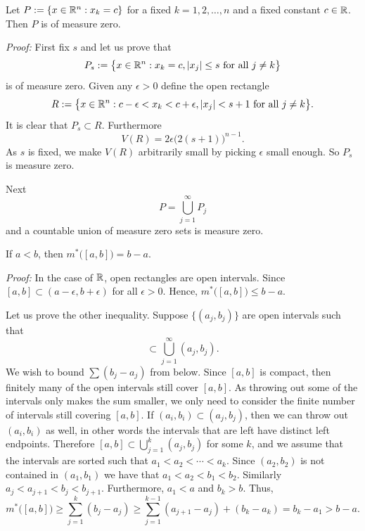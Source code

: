 \begin{example} \label{mv:example:planenull}
Let $P := \{ x \in {\mathbb{R}}^n : x_k = c \}$ for a fixed $k=1,2,\ldots,n$ and
a fixed constant $c \in {\mathbb{R}}$.  Then $P$ is of measure zero.

\emph{Proof:}
First fix $s$ and let us prove that
\begin{equation*}
P_s := \bigl\{ x \in {\mathbb{R}}^n : x_k = c, \lvert {x_j} \rvert \leq s \text{ for all
$j\not=k$} \bigr\}
\end{equation*}
is of measure zero.
Given any $\epsilon > 0$ define the open rectangle
\begin{equation*}
R := \bigl\{ x \in {\mathbb{R}}^n : c-\epsilon < x_k < c+\epsilon, \lvert {x_j} \rvert < s+1
\text{ for all $j\not=k$} \bigr\} .
\end{equation*}
It is clear that $P_s \subset R$.  Furthermore
\begin{equation*}
V(R) = 2\epsilon {\bigl(2(s+1)\bigr)}^{n-1} .
\end{equation*}
As $s$ is fixed, we
make $V(R)$
arbitrarily small by
picking $\epsilon$ small enough.
So $P_s$ is measure zero.

Next 
\begin{equation*}
P = \bigcup_{j=1}^\infty P_j
\end{equation*}
and a countable union of measure zero sets is measure zero.
\end{example}

\begin{example}
If $a < b$, then $m^*\bigl([a,b]\bigr) = b-a$.

\emph{Proof:}
In the case of ${\mathbb{R}}$, open rectangles are open intervals.
Since $[a,b] \subset (a-\epsilon,b+\epsilon)$ for all $\epsilon > 0$.
Hence, $m^*\bigl([a,b]\bigr) \leq b-a$.

Let us prove the other inequality.
Suppose $\bigl\{ (a_j,b_j) \bigr\}$ are open intervals such that
\begin{equation*}
[a,b] \subset \bigcup_{j=1}^\infty (a_j,b_j) .
\end{equation*}
We wish to bound $\sum (b_j-a_j)$ from below.
Since $[a,b]$ is compact, then finitely many of the open intervals
still cover $[a,b]$.  As throwing out some of the intervals only makes the
sum smaller, we only need to consider the finite number of intervals
still covering $[a,b]$.
If $(a_i,b_i) \subset (a_j,b_j)$, then we can throw out
$(a_i,b_i)$ as well, in other words the intervals that are left
have distinct left endpoints.
Therefore 
$[a,b] \subset \bigcup_{j=1}^k (a_j,b_j)$ for some $k$, and
we assume that the intervals are sorted such that $a_1 < a_2 < \cdots <
a_k$.  Since $(a_2,b_2)$ is not contained in $(a_1,b_1)$
we have that $a_1 < a_2 < b_1 < b_2$.  Similarly
$a_j < a_{j+1} < b_j < b_{j+1}$.  Furthermore, $a_1 < a$ and $b_k > b$.
Thus,
\begin{equation*}
m^*\bigl([a,b]\bigr) \geq
\sum_{j=1}^k (b_j-a_j)
\geq
\sum_{j=1}^{k-1} (a_{j+1}-a_j)
+
(b_k-a_k)
=
b_k-a_1 > b-a .
\end{equation*}
\end{example}

